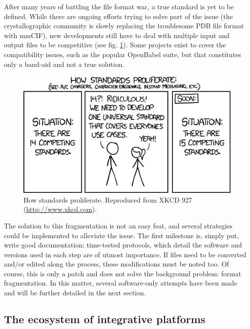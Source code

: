 After many years of battling the file format war, a true standard is yet to be defined. While there are ongoing efforts trying to solve part of the issue (the crystallographic community is slowly replacing the troublesome PDB file format with mmCIF\cite{bourne1997,berman2007}), new developments still have to deal with multiple input and output files to be competitive (see fig. \ref{fig:xkcd}). Some projects exist to cover the compatibility issues, such as the popular OpenBabel suite, \cite{oboyle2011} but that constitutes only a band-aid and not a true solution.

\begin{figure}[H]
	\includegraphics[width=\textwidth]{./figures/01/xkcd927.png}
	\caption[Proliferation of standards]{How standards proliferate. Reproduced from XKCD 927 (\url{http://www.xkcd.com}).}
	\label{fig:xkcd}
\end{figure}


The solution to this fragmentation is not an easy feat, and several strategies could be implemented to alleviate the issue. The first milestone is, simply put, write good documentation: time-tested protocols, which detail the software and versions used in each step are of utmost importance. If files need to be converted and/or edited along the process, these modifications must be noted too. Of course, this is only a patch and does not solve the background problem: format fragmentation. In this matter, several software-only attempts have been made and will be further detailed in the next section.

\subsection{The ecosystem of integrative platforms}

